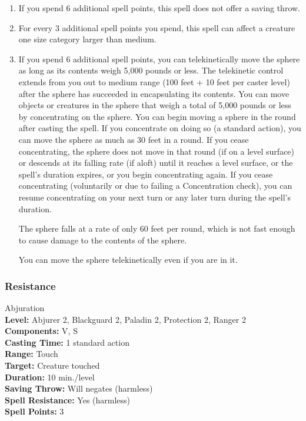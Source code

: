 \begin{enumerate}
 \item If you spend 6 additional spell points, this spell does not offer a saving throw.
 \item For every 3 additional spell points you spend, this spell can affect a creature one size category larger than medium.
 \item If you spend 6 additional spell points, 
you can telekinetically move the sphere as long as its contents weigh 5,000 pounds or less. 
The telekinetic control extends from you out to medium range (100 feet + 10 feet per caster level) after the sphere has succeeded in encapsulating its contents.
You can move objects or creatures in the sphere that weigh a total of 5,000 pounds or less by concentrating on the sphere. 
You can begin moving a sphere in the round after casting the spell. 
If you concentrate on doing so (a standard action), you can move the sphere as much as 30 feet in a round. 
If you cease concentrating, the sphere does not move in that round (if on a level surface) or descends at its falling rate (if aloft) until it reaches a level surface, 
or the spell's duration expires, or you begin concentrating again. 
If you cease concentrating (voluntarily or due to failing a Concentration check), you can resume concentrating on your next turn or any later turn during the spell's duration.

The sphere falls at a rate of only 60 feet per round, which is not fast enough to cause damage to the contents of the sphere.

You can move the sphere telekinetically even if you are in it. 
\end{enumerate}
\subsubsection{Resistance}
\label{Spell:Resistance}
Abjuration
\\ \textbf{Level:} Abjurer 2, Blackguard 2, Paladin 2, Protection 2, Ranger 2
\\ \textbf{Components:} V, S
\\ \textbf{Casting Time:} 1 standard action
\\ \textbf{Range:} Touch
\\ \textbf{Target:} Creature touched
\\ \textbf{Duration:} 10 min./level
\\ \textbf{Saving Throw:} Will negates (harmless)
\\ \textbf{Spell Resistance:} Yes (harmless)
\\ \textbf{Spell Points:} 3

